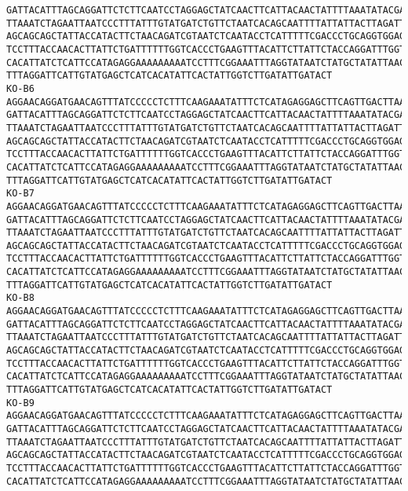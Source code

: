 \documentclass[11pt]{article}
\begin{document}
\begin{Verbatim}[commandchars=\\\{\}]
GATTACATTTAGCAGGATTCTCTTCAATCCTAGGAGCTATCAACTTCATTACAACTATTTTAAATATACGACCAAAAAAC
TTAAATCTAGAATTAATCCCTTTATTTGTATGATCTGTTCTAATCACAGCAATTTTATTATTACTTAGATTACCAGTCTT
AGCAGCAGCTATTACCATACTTCTAACAGATCGTAATCTCAATACCTCATTTTTCGACCCTGCAGGTGGAGGAGACCCAA
TCCTTTACCAACACTTATTCTGATTTTTTGGTCACCCTGAAGTTTACATTCTTATTCTACCAGGATTTGGTATTATTTCT
CACATTATCTCATTCCATAGAGGAAAAAAAAATCCTTTCGGAAATTTAGGTATAATCTATGCTATATTAACTATTGGAAT
TTTAGGATTCATTGTATGAGCTCATCACATATTCACTATTGGTCTTGATATTGATACT
KO-B6
AGGAACAGGATGAACAGTTTATCCCCCTCTTTCAAGAAATATTTCTCATAGAGGAGCTTCAGTTGACTTAAGAATCTTCA
GATTACATTTAGCAGGATTCTCTTCAATCCTAGGAGCTATCAACTTCATTACAACTATTTTAAATATACGACCAAAAAAC
TTAAATCTAGAATTAATCCCTTTATTTGTATGATCTGTTCTAATCACAGCAATTTTATTATTACTTAGATTACCAGTCTT
AGCAGCAGCTATTACCATACTTCTAACAGATCGTAATCTCAATACCTCATTTTTCGACCCTGCAGGTGGAGGAGACCCAA
TCCTTTACCAACACTTATTCTGATTTTTTGGTCACCCTGAAGTTTACATTCTTATTCTACCAGGATTTGGTATTATTTCT
CACATTATCTCATTCCATAGAGGAAAAAAAAATCCTTTCGGAAATTTAGGTATAATCTATGCTATATTAACTATTGGAAT
TTTAGGATTCATTGTATGAGCTCATCACATATTCACTATTGGTCTTGATATTGATACT
KO-B7
AGGAACAGGATGAACAGTTTATCCCCCTCTTTCAAGAAATATTTCTCATAGAGGAGCTTCAGTTGACTTAAGAATCTTCA
GATTACATTTAGCAGGATTCTCTTCAATCCTAGGAGCTATCAACTTCATTACAACTATTTTAAATATACGACCAAAAAAC
TTAAATCTAGAATTAATCCCTTTATTTGTATGATCTGTTCTAATCACAGCAATTTTATTATTACTTAGATTACCAGTCTT
AGCAGCAGCTATTACCATACTTCTAACAGATCGTAATCTCAATACCTCATTTTTCGACCCTGCAGGTGGAGGAGACCCAA
TCCTTTACCAACACTTATTCTGATTTTTTGGTCACCCTGAAGTTTACATTCTTATTCTACCAGGATTTGGTATTATTTCT
CACATTATCTCATTCCATAGAGGAAAAAAAAATCCTTTCGGAAATTTAGGTATAATCTATGCTATATTAACTATTGGAAT
TTTAGGATTCATTGTATGAGCTCATCACATATTCACTATTGGTCTTGATATTGATACT
KO-B8
AGGAACAGGATGAACAGTTTATCCCCCTCTTTCAAGAAATATTTCTCATAGAGGAGCTTCAGTTGACTTAAGAATCTTCA
GATTACATTTAGCAGGATTCTCTTCAATCCTAGGAGCTATCAACTTCATTACAACTATTTTAAATATACGACCAAAAAAC
TTAAATCTAGAATTAATCCCTTTATTTGTATGATCTGTTCTAATCACAGCAATTTTATTATTACTTAGATTACCAGTCTT
AGCAGCAGCTATTACCATACTTCTAACAGATCGTAATCTCAATACCTCATTTTTCGACCCTGCAGGTGGAGGAGACCCAA
TCCTTTACCAACACTTATTCTGATTTTTTGGTCACCCTGAAGTTTACATTCTTATTCTACCAGGATTTGGTATTATTTCT
CACATTATCTCATTCCATAGAGGAAAAAAAAATCCTTTCGGAAATTTAGGTATAATCTATGCTATATTAACTATTGGAAT
TTTAGGATTCATTGTATGAGCTCATCACATATTCACTATTGGTCTTGATATTGATACT
KO-B9
AGGAACAGGATGAACAGTTTATCCCCCTCTTTCAAGAAATATTTCTCATAGAGGAGCTTCAGTTGACTTAAGAATCTTCA
GATTACATTTAGCAGGATTCTCTTCAATCCTAGGAGCTATCAACTTCATTACAACTATTTTAAATATACGACCAAAAAAC
TTAAATCTAGAATTAATCCCTTTATTTGTATGATCTGTTCTAATCACAGCAATTTTATTATTACTTAGATTACCAGTCTT
AGCAGCAGCTATTACCATACTTCTAACAGATCGTAATCTCAATACCTCATTTTTCGACCCTGCAGGTGGAGGAGACCCAA
TCCTTTACCAACACTTATTCTGATTTTTTGGTCACCCTGAAGTTTACATTCTTATTCTACCAGGATTTGGTATTATTTCT
CACATTATCTCATTCCATAGAGGAAAAAAAAATCCTTTCGGAAATTTAGGTATAATCTATGCTATATTAACTATTGGAAT

\end{Verbatim}
\end{document}
